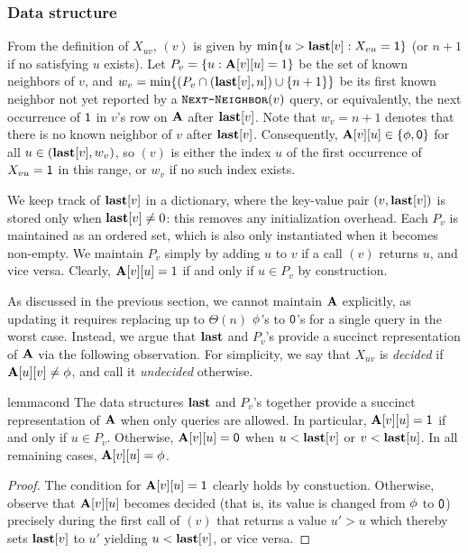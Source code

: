 \subsubsection{Data structure}\label{sec:nn-ds}

From the definition of $X_{uv}$, $(v)$ is given by $\min\{u > \mathbf{last}[v]: X_{vu} = \mathsf{1}\}$ (or $n+1$ if no satisfying $u$ exists). Let
$P_v = \{u: \mathbf{A}[v][u]=1\}$ be the set of known neighbors of $v$, and $w_v = \min \{(P_v \cap (\mathbf{last}[v], n]) \cup \{n+1\}\}$ be its first known neighbor not yet reported by a $\texttt{\textsc{Next-Neighbor}}(v)$ query, or equivalently, the next occurrence of $\mathsf{1}$ in $v$'s row on $\mathbf{A}$ after $\mathbf{last}[v]$. Note that $w_v = n+1$ denotes that there is no known neighbor of $v$ after $\mathbf{last}[v]$.
Consequently, $\mathbf{A}[v][u] \in \{\phi,\mathsf{0}\}$ for all $u \in (\mathbf{last}[v], w_v)$, so $(v)$ is
either the index $u$ of the first occurrence of $X_{vu} = \mathsf{1}$ in this range, or $w_v$ if no such index exists.

We keep track of $\mathbf{last}[v]$ in a dictionary, where the key-value pair $(v,\mathbf{last}[v])$ is stored only when $\mathbf{last}[v] \neq 0$: this removes any initialization overhead.
Each $P_v$ is maintained as an ordered set, which is also only instantiated when it becomes non-empty.
We maintain $P_v$ simply by adding $u$ to $v$ if a call $(v)$ returns $u$, and vice versa. Clearly, $\mathbf{A}[v][u]=1$ if and only if $u \in P_v$ by construction.

As discussed in the previous section, we cannot maintain $\mathbf{A}$ explicitly, as updating it requires replacing up to $\Theta(n)$ $\phi$'s to $\mathsf{0}$'s for a single  query in the worst case. Instead, we argue that $\mathbf{last}$ and $P_v$'s provide a succinct representation of $\mathbf{A}$ via the following observation. For simplicity, we say that $X_{uv}$ is \emph{decided} if $\mathbf{A}[u][v] \neq \phi$, and call it \emph{undecided} otherwise.

\begin{restatable}{lemma}{cond}\label{lem:cond-0}
The data structures $\mathbf{last}$ and $P_v$'s together provide a succinct representation of $\mathbf{A}$ when only  queries are allowed. In particular, $\mathbf{A}[v][u]=\mathsf{1}$ if and only if $u \in P_v$. Otherwise, $\mathbf{A}[v][u]=\mathsf{0}$ when $u <\mathbf{last}[v]$ or $v < \mathbf{last}[u]$. In all remaining cases, $\mathbf{A}[v][u]=\phi$.
\end{restatable}
\begin{proof}
The condition for $\mathbf{A}[v][u]=\mathsf{1}$ clearly holds by constuction. Otherwise, observe that $\mathbf{A}[v][u]$ becomes decided (that is, its value is changed from $\phi$ to $\mathsf{0}$) precisely during the first call of $(v)$ that returns a value $u' > u$ which thereby sets $\mathbf{last}[v]$ to $u'$ yielding $u<\mathbf{last}[v]$, or vice versa.
\end{proof}

